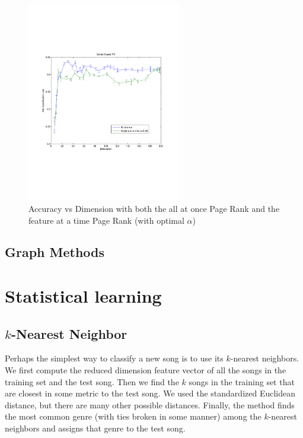 \documentclass[12pt]{article}
\begin{document}
\begin{figure}[!h]
\begin{center}
\vspace{-1in}
\includegraphics[width=0.6\textwidth]{figures/adjPR.pdf}
\vspace{-1in}
\caption{Accuracy vs Dimension with both the all at once Page Rank and the feature at a time Page Rank (with optimal $\alpha$)}
\end{center}
\end{figure}

\subsection*{Graph Methods}

\section{Statistical learning}
\subsection{$k$-Nearest Neighbor}
Perhaps the simplest way to classify a new song is to use its $k$-nearest neighbors.  We first compute the reduced dimension feature vector of all the songs in the training set and the test song.  Then we find the $k$ songs in the training set that are closest in some metric to the test song.  We used the standardized Euclidean distance, but there are many other possible distances.  Finally, the method finds the most common genre (with ties broken in some manner) among the $k$-nearest neighbors and assigns that genre to the test song.\\
\end{document}
